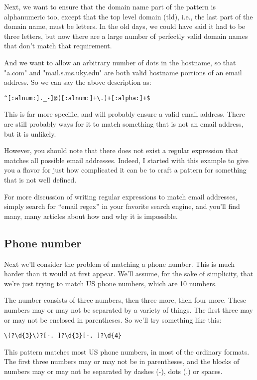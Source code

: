 Next, we want to ensure that the domain name part of the pattern is alphanumeric too, 
except that the top level domain (tld), i.e., the last part of the domain name, must be letters. In 
the old days, we could have said it had to be three letters, but now there are a large number of 
perfectly valid domain names that don't match that requirement.

And we want to allow an arbitrary number of dots in the hostname, so that "a.com" and 
"mail.s.ms.uky.edu" are both valid hostname portions of an email address.
So we can say the above description as:

\begin{verbatim}
^[:alnum:]._-]@([:alnum:]+\.)+[:alpha:]+$
\end{verbatim}

This is far more specific, and will probably ensure a valid email address. There are still 
probably ways for it to match something that is not an email address, but it is unlikely.

However, you should note that there does not exist a regular expression
that matches all possible email addresses. Indeed, I started with
this example to give you a flavor for just how complicated it can be to
craft a pattern for something that is not well defined.

For more discussion of writing regular expressions to match email
addresses, simply search for ``email regex'' in your favorite search
engine, and you'll find many, many articles about how and why it is
impossible. 

\subsection{Phone number}

Next we'll consider the problem of matching a phone number. This is much harder than it 
would at first appear. We'll assume, for the sake of simplicity, that we're just trying to match 
US phone numbers, which are 10 numbers.

The number consists of three numbers, then three more, then four more. These numbers 
may or may not be separated by a variety of things. The first three may or may not be 
enclosed in parentheses. So we'll try something like this:

\verb=\(?\d{3}\)?[-. ]?\d{3}[-. ]?\d{4}=

This pattern matches most US phone numbers, in most of the ordinary formats. The 
first three numbers may or may not be in parentheses, and the blocks of numbers may or may 
not be separated by dashes (-), dots (.) or spaces.

